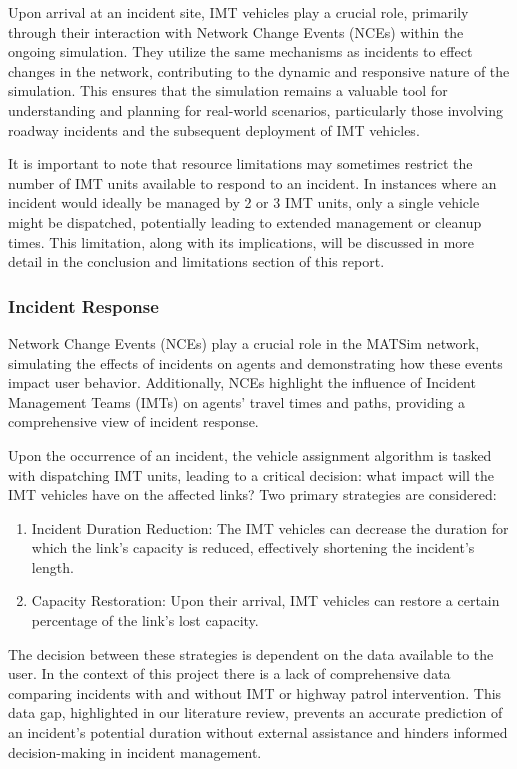 \documentclass[
  letterpaper,
  authoryear]{elsarticle}
\providecommand{\tightlist}{%
  \setlength{\itemsep}{0pt}\setlength{\parskip}{0pt}}\usepackage{longtable,booktabs,array}
\begin{document}
Upon arrival at an incident site, IMT vehicles play a crucial role,
primarily through their interaction with Network Change Events (NCEs)
within the ongoing simulation. They utilize the same mechanisms as
incidents to effect changes in the network, contributing to the dynamic
and responsive nature of the simulation. This ensures that the
simulation remains a valuable tool for understanding and planning for
real-world scenarios, particularly those involving roadway incidents and
the subsequent deployment of IMT vehicles.

It is important to note that resource limitations may sometimes restrict
the number of IMT units available to respond to an incident. In
instances where an incident would ideally be managed by 2 or 3 IMT
units, only a single vehicle might be dispatched, potentially leading to
extended management or cleanup times. This limitation, along with its
implications, will be discussed in more detail in the conclusion and
limitations section of this report.

\hypertarget{incident-response}{%
\subsubsection{Incident Response}\label{incident-response}}

Network Change Events (NCEs) play a crucial role in the MATSim network,
simulating the effects of incidents on agents and demonstrating how
these events impact user behavior. Additionally, NCEs highlight the
influence of Incident Management Teams (IMTs) on agents' travel times
and paths, providing a comprehensive view of incident response.

Upon the occurrence of an incident, the vehicle assignment algorithm is
tasked with dispatching IMT units, leading to a critical decision: what
impact will the IMT vehicles have on the affected links? Two primary
strategies are considered:

\begin{enumerate}
\def\labelenumi{\arabic{enumi}.}
\tightlist
\item
  Incident Duration Reduction: The IMT vehicles can decrease the
  duration for which the link's capacity is reduced, effectively
  shortening the incident's length.
\item
  Capacity Restoration: Upon their arrival, IMT vehicles can restore a
  certain percentage of the link's lost capacity.
\end{enumerate}

The decision between these strategies is dependent on the data available
to the user. In the context of this project there is a lack of
comprehensive data comparing incidents with and without IMT or highway
patrol intervention. This data gap, highlighted in our literature
review, prevents an accurate prediction of an incident's potential
duration without external assistance and hinders informed
decision-making in incident management.
\end{document}
